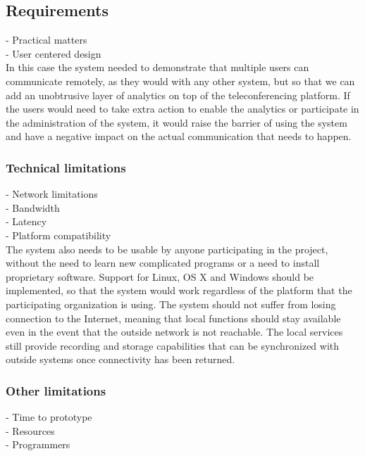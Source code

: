 \documentclass[english,12pt,a4paper,dvips]{article}
\begin{document}
\subsection{Requirements}
- Practical matters \\
- User centered design \\

In this case the system needed to demonstrate that multiple users can communicate remotely, as they would with any other system, but so that we can add an unobtrusive layer of analytics on top of the teleconferencing platform. If the users would need to take extra action to enable the analytics or participate in the administration of the system, it would raise the barrier of using the system and have a negative impact on the actual communication that needs to happen. 

\subsubsection{Technical limitations}

- Network limitations\\
- Bandwidth\\
- Latency\\
- Platform compatibility\\

The system also needs to be usable by anyone participating in the project, without the need to learn new complicated programs or a need to install proprietary software. Support for Linux, OS X and Windows should be implemented, so that the system would work regardless of the platform that the participating organization is using. The system should not suffer from losing connection to the Internet, meaning that local functions should stay available even in the event that the outside network is not reachable. The local services still provide recording and storage capabilities that can be synchronized with outside systems once connectivity has been returned.


\subsubsection{Other limitations}

- Time to prototype\\
- Resources\\
- Programmers\\
\end{document}
